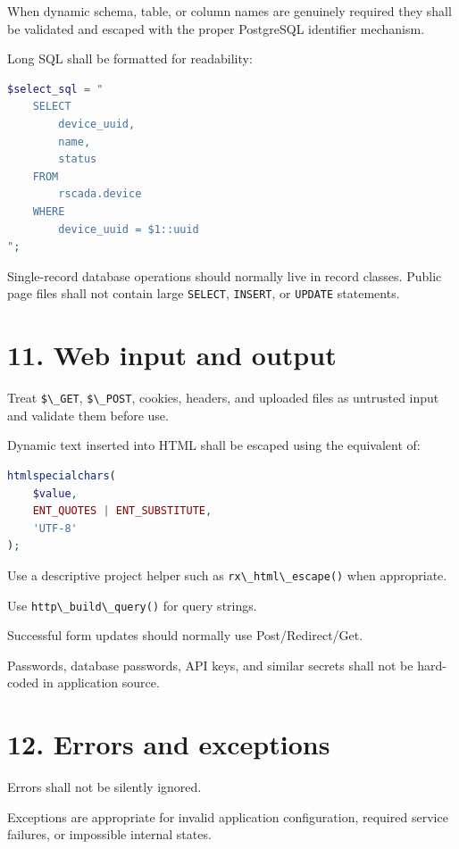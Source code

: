\documentclass[11pt,a4paper]{article}
\begin{document}
When dynamic schema, table, or column names are genuinely required they
shall be validated and escaped with the proper PostgreSQL identifier
mechanism.

Long SQL shall be formatted for readability:

\begin{lstlisting}[language=PHP]
$select_sql = "
    SELECT
        device_uuid,
        name,
        status
    FROM
        rscada.device
    WHERE
        device_uuid = $1::uuid
";
\end{lstlisting}

Single-record database operations should normally live in record
classes. Public page files shall not contain large
\passthrough{\lstinline!SELECT!}, \passthrough{\lstinline!INSERT!}, or
\passthrough{\lstinline!UPDATE!} statements.

\section{11. Web input and output}\label{11-web-input-and-output}

Treat \passthrough{\lstinline!$\_GET!},
\passthrough{\lstinline!$\_POST!}, cookies, headers, and uploaded files
as untrusted input and validate them before use.

Dynamic text inserted into HTML shall be escaped using the equivalent
of:

\begin{lstlisting}[language=PHP]
htmlspecialchars(
    $value,
    ENT_QUOTES | ENT_SUBSTITUTE,
    'UTF-8'
);
\end{lstlisting}

Use a descriptive project helper such as
\passthrough{\lstinline!rx\_html\_escape()!} when appropriate.

Use \passthrough{\lstinline!http\_build\_query()!} for query strings.

Successful form updates should normally use Post/Redirect/Get.

Passwords, database passwords, API keys, and similar secrets shall not
be hard-coded in application source.

\section{12. Errors and exceptions}\label{12-errors-and-exceptions}

Errors shall not be silently ignored.

Exceptions are appropriate for invalid application configuration,
required service failures, or impossible internal states.
\end{document}
